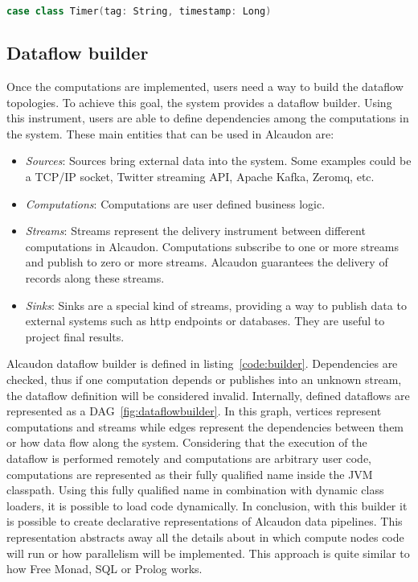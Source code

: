 \begin{lstlisting}[language=scala, frame=trBL, label=code:timers, float=ht, caption = {Timer class}]
  case class Timer(tag: String, timestamp: Long)
\end{lstlisting}

\subsection{Dataflow builder}

Once the computations are implemented, users need a way to build the dataflow topologies.
To achieve this goal, the system provides a dataflow builder. Using this instrument,
users are able to define dependencies among the computations in the system.
These main entities that can be used in Alcaudon are:

\begin{itemize}
  \item \textit{Sources}: Sources bring external data into the system. Some
    examples could be a TCP/IP socket, Twitter streaming API, Apache Kafka,
    Zeromq, etc.
  \item \textit{Computations}: Computations are user defined business logic.
  \item \textit{Streams}: Streams represent the delivery instrument between
    different computations in Alcaudon. Computations subscribe to one or more
    streams and publish to zero or more streams. Alcaudon guarantees the
    delivery of records along these streams.
  \item \textit{Sinks}: Sinks are a special kind of streams, providing a way to
    publish data to external systems such as http endpoints or databases. They
    are useful to project final results.
\end{itemize}

Alcaudon dataflow builder is defined in listing~\ref{code:builder}. Dependencies
are checked, thus if one computation depends or publishes into an unknown stream,
the dataflow definition will be considered invalid. Internally, defined
dataflows are represented as a \acf{DAG}~\ref{fig:dataflowbuilder}. In this graph, vertices
represent computations and streams while edges represent the dependencies
between them or how data flow along the system. Considering that the execution
of the dataflow is performed remotely and computations are arbitrary user code,
computations are represented as their fully qualified name inside the \acs{JVM}
classpath. Using this fully qualified name in combination with dynamic class
loaders, it is possible to load code dynamically. In conclusion, with this builder
it is possible to create declarative representations of Alcaudon data pipelines.
This representation abstracts away all the details about in which compute nodes
code will run or how parallelism will be implemented. This approach is quite
similar to how Free Monad\cite{freemonad}, SQL or Prolog works.

